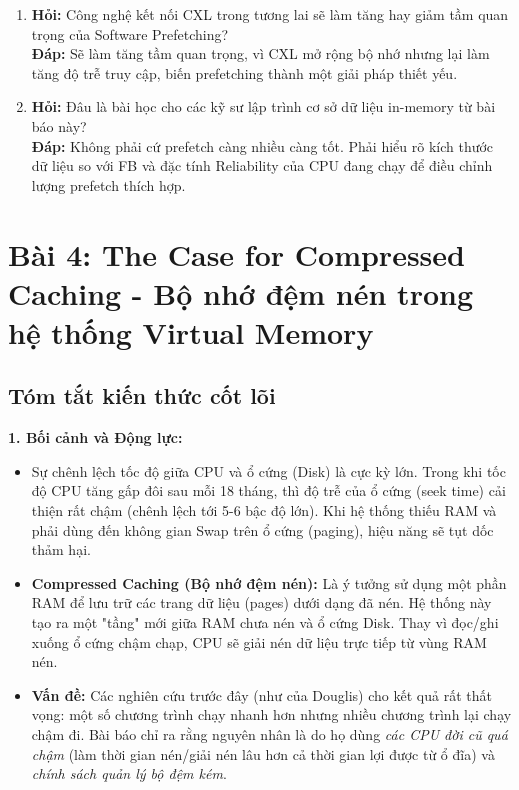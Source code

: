 \documentclass[12pt,a4paper]{article}
\begin{document}
\begin{enumerate}
    \item \textbf{Hỏi:} Công nghệ kết nối CXL trong tương lai sẽ làm tăng hay giảm tầm quan trọng của Software Prefetching? \\
    \textbf{Đáp:} Sẽ làm tăng tầm quan trọng, vì CXL mở rộng bộ nhớ nhưng lại làm tăng độ trễ truy cập, biến prefetching thành một giải pháp thiết yếu.
    
    \item \textbf{Hỏi:} Đâu là bài học cho các kỹ sư lập trình cơ sở dữ liệu in-memory từ bài báo này? \\
    \textbf{Đáp:} Không phải cứ prefetch càng nhiều càng tốt. Phải hiểu rõ kích thước dữ liệu so với FB và đặc tính Reliability của CPU đang chạy để điều chỉnh lượng prefetch thích hợp.
\end{enumerate}

\newpage
\section{Bài 4: The Case for Compressed Caching - Bộ nhớ đệm nén trong hệ thống Virtual Memory}

\subsection{Tóm tắt kiến thức cốt lõi}

\textbf{1. Bối cảnh và Động lực:}
\begin{itemize}
    \item Sự chênh lệch tốc độ giữa CPU và ổ cứng (Disk) là cực kỳ lớn. Trong khi tốc độ CPU tăng gấp đôi sau mỗi 18 tháng, thì độ trễ của ổ cứng (seek time) cải thiện rất chậm (chênh lệch tới 5-6 bậc độ lớn). Khi hệ thống thiếu RAM và phải dùng đến không gian Swap trên ổ cứng (paging), hiệu năng sẽ tụt dốc thảm hại.
    \item \textbf{Compressed Caching (Bộ nhớ đệm nén):} Là ý tưởng sử dụng một phần RAM để lưu trữ các trang dữ liệu (pages) dưới dạng đã nén. Hệ thống này tạo ra một "tầng" mới giữa RAM chưa nén và ổ cứng Disk. Thay vì đọc/ghi xuống ổ cứng chậm chạp, CPU sẽ giải nén dữ liệu trực tiếp từ vùng RAM nén.
    \item \textbf{Vấn đề:} Các nghiên cứu trước đây (như của Douglis) cho kết quả rất thất vọng: một số chương trình chạy nhanh hơn nhưng nhiều chương trình lại chạy chậm đi. Bài báo chỉ ra rằng nguyên nhân là do họ dùng \textit{các CPU đời cũ quá chậm} (làm thời gian nén/giải nén lâu hơn cả thời gian lợi được từ ổ đĩa) và \textit{chính sách quản lý bộ đệm kém}.
\end{itemize}
\end{document}
